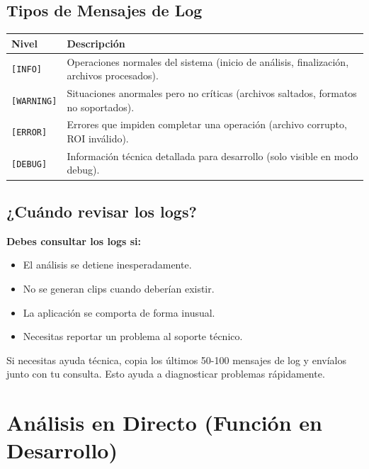 \documentclass[11pt,a4paper]{article}
\begin{document}
\subsection{Tipos de Mensajes de Log}

\begin{longtable}{|p{3cm}|p{11cm}|}
\hline
\textbf{Nivel} & \textbf{Descripción} \\ \hline
\endhead

\texttt{[INFO]} & Operaciones normales del sistema (inicio de análisis, finalización, archivos procesados). \\ \hline

\texttt{[WARNING]} & Situaciones anormales pero no críticas (archivos saltados, formatos no soportados). \\ \hline

\texttt{[ERROR]} & Errores que impiden completar una operación (archivo corrupto, ROI inválido). \\ \hline

\texttt{[DEBUG]} & Información técnica detallada para desarrollo (solo visible en modo debug). \\ \hline
\end{longtable}

\subsection{¿Cuándo revisar los logs?}

\textbf{Debes consultar los logs si:}
\begin{itemize}
    \item El análisis se detiene inesperadamente.
    \item No se generan clips cuando deberían existir.
    \item La aplicación se comporta de forma inusual.
    \item Necesitas reportar un problema al soporte técnico.
\end{itemize}

\begin{tcolorbox}[colback=primaryblue!10,colframe=primaryblue,title=Tip para Soporte]
Si necesitas ayuda técnica, copia los últimos 50-100 mensajes de log y envíalos junto con tu consulta. Esto ayuda a diagnosticar problemas rápidamente.
\end{tcolorbox}

\section{Análisis en Directo (Función en Desarrollo)}
\end{document}
